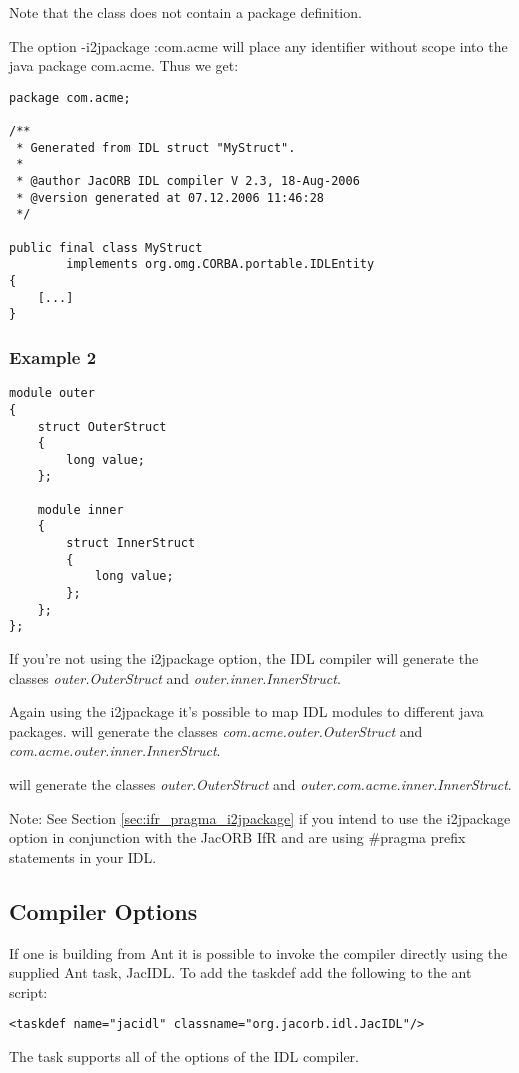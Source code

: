 Note that the class does not contain a package definition.

The option -i2jpackage :com.acme will place any identifier without scope into
the java package com.acme. Thus we get:
\begin{verbatim}
package com.acme;

/**
 * Generated from IDL struct "MyStruct".
 *
 * @author JacORB IDL compiler V 2.3, 18-Aug-2006
 * @version generated at 07.12.2006 11:46:28
 */

public final class MyStruct
        implements org.omg.CORBA.portable.IDLEntity
{
    [...]
}
\end{verbatim}

\subsubsection{Example 2}

\begin{verbatim}
module outer
{
    struct OuterStruct
    {
        long value;
    };

    module inner
    {
        struct InnerStruct
        {
            long value;
        };
    };
};
\end{verbatim}

If you're not using the i2jpackage option, the IDL compiler will generate
the classes \emph{outer.OuterStruct} and \emph{outer.inner.InnerStruct}.

Again using the i2jpackage it's possible to map IDL modules to different java
packages.
 will generate the classes
\emph{com.acme.outer.OuterStruct} and \emph{com.acme.outer.inner.InnerStruct}.

 will generate the classes
\emph{outer.OuterStruct} and \emph{outer.com.acme.inner.InnerStruct}.

Note: See Section \ref{sec:ifr_pragma_i2jpackage} if you intend to use the
i2jpackage option in conjunction with the JacORB IfR and are using \#pragma
prefix statements in your IDL.


\subsection*{Compiler Options}
If one is building from Ant it is possible to invoke the compiler directly
using the supplied Ant task, JacIDL. To add the taskdef add the following
to the ant script:
\small{
\begin{verbatim}
<taskdef name="jacidl" classname="org.jacorb.idl.JacIDL"/>
\end{verbatim}
}
The task supports all of the options of the IDL compiler.

